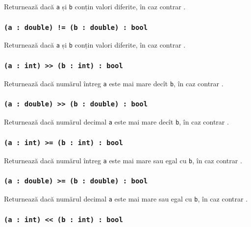 Returnează \true{} dacă \texttt{a} și \texttt{b} conțin valori diferite, în caz contrar \false{}.

\subsubsection{\texttt{(a : double) != (b : double) : bool}}

Returnează \true{} dacă \texttt{a} și \texttt{b} conțin valori diferite, în caz contrar \false{}.

\subsubsection{\texttt{(a : int) >> (b : int) : bool}}

Returnează \true{} dacă numărul întreg \texttt{a} este mai mare decît \texttt{b}, în caz contrar \false{}.

\subsubsection{\texttt{(a : double) >> (b : double) : bool}}

Returnează \true{} dacă numărul decimal \texttt{a} este mai mare decît \texttt{b}, în caz contrar \false{}.

\subsubsection{\texttt{(a : int) >= (b : int) : bool}}

Returnează \true{} dacă numărul întreg \texttt{a} este mai mare sau egal cu \texttt{b}, în caz contrar \false{}.

\subsubsection{\texttt{(a : double) >= (b : double) : bool}}

Returnează \true{} dacă numărul decimal \texttt{a} este mai mare sau egal cu \texttt{b}, în caz contrar \false{}.

\subsubsection{\texttt{(a : int) << (b : int) : bool}}


